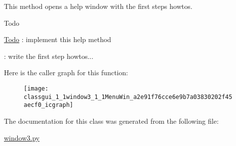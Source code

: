 This method opens a help window with the first steps howtos. 

\begin{DoxyRefDesc}{Todo}
\item[\hyperlink{todo__todo000025}{Todo}]\-: implement this help method 

\-: write the first step howtos... \end{DoxyRefDesc}


Here is the caller graph for this function\-:\nopagebreak
\begin{figure}[H]
\begin{center}
\leavevmode
\texttt{[image: classgui\_1\_1window3\_1\_1MenuWin\_a2e91f76cce6e9b7a03830202f45aecf0\_icgraph]}
\end{center}
\end{figure}




The documentation for this class was generated from the following file\-:\begin{DoxyCompactItemize}
\item 
\hyperlink{window3_8py}{window3.\-py}\end{DoxyCompactItemize}
